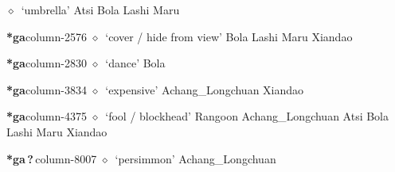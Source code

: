 \hspace{1ex}
         $\diamond$~`umbrella'
         Atsi 
\hspace{1ex}
         Bola 
\hspace{1ex}
         Lashi 
\hspace{1ex}
         Maru 
  \item {\footnotesize \textbf{*ga}}{\tiny column-2576}
         $\diamond$~`cover / hide from view'
         Bola 
\hspace{1ex}
         Lashi 
\hspace{1ex}
         Maru 
\hspace{1ex}
         Xiandao 
  \item {\footnotesize \textbf{*ga}}{\tiny column-2830}
         $\diamond$~`dance'
         Bola 
  \item {\footnotesize \textbf{*ga}}{\tiny column-3834}
         $\diamond$~`expensive'
         Achang\_Longchuan 
\hspace{1ex}
         Xiandao 
  \item {\footnotesize \textbf{*ga}}{\tiny column-4375}
         $\diamond$~`fool / blockhead'
         Rangoon 
\hspace{1ex}
         Achang\_Longchuan 
\hspace{1ex}
         Atsi 
\hspace{1ex}
         Bola 
\hspace{1ex}
         Lashi 
\hspace{1ex}
         Maru 
\hspace{1ex}
         Xiandao 
  \item {\footnotesize \textbf{*ga\,?\,}}{\tiny column-8007}
         $\diamond$~`persimmon'
         Achang\_Longchuan 
\hspace{1ex}
